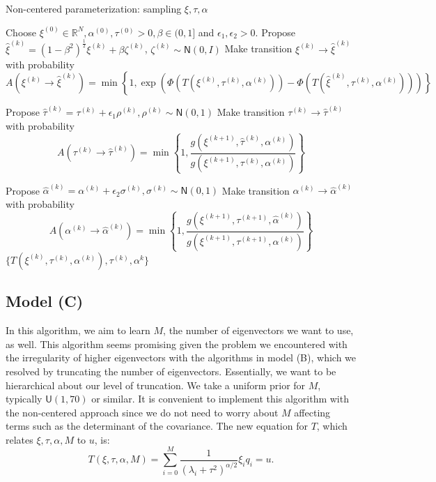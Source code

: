 \documentclass{siamart1116}
\begin{document}
        \begin{algorithm}
        \caption{Non-centered parameterization: sampling $\xi, \tau, \alpha$}
        \label{alg:xi_tau_alpha}
        \begin{algorithmic}
        \State Choose $\xi^{(0)} \in \mathbb{R}^N, \alpha^{(0)}, \tau^{(0)} > 0, \beta \in (0, 1]$ and $\epsilon_1, \epsilon_2 > 0$.
        \State Propose $\hat\xi^{(k)} = (1-\beta^2)^{\frac{1}{2}}\xi^{(k)} + \beta \zeta^{(k)}$, $\zeta^{(k)} \sim \mathsf{N}(0, I)$
        \State Make transition $\xi^{(k)} \to \hat\xi^{(k)}$ with probability
        \[ A(\xi^{(k)} \to \hat\xi^{(k)}) = \min\left\{1, \exp\left(\Phi(T(\xi^{(k)},\tau^{(k)},\alpha^{(k)})) - \Phi(T(\hat\xi^{(k)},\tau^{(k)},\alpha^{(k)}))\right) \right\}\] 

        \State Propose $\hat\tau^{(k)} = \tau^{(k)} + \epsilon_1 \rho^{(k)}, \rho^{(k)} \sim \mathsf{N}(0,1)$
        \State Make transition $\tau^{(k)} \to \hat\tau^{(k)}$ with probability
        \[ A(\tau^{(k)} \to \hat\tau^{(k)}) = \min\left\{1, \frac{g(\xi^{(k+1)},\hat\tau^{(k)},\alpha^{(k)})}{g(\xi^{(k+1)},\tau^{(k)},\alpha^{(k)})} \right\}\] 

        \State Propose $\hat\alpha^{(k)} = \alpha^{(k)} + \epsilon_2 \sigma^{(k)}, \sigma^{(k)} \sim \mathsf{N}(0,1)$
        \State Make transition $\alpha^{(k)} \to \hat\alpha^{(k)}$ with probability
        \[ A(\alpha^{(k)} \to \hat\alpha^{(k)}) = \min\left\{1, \frac{g(\xi^{(k+1)},\tau^{(k+1)},\hat \alpha^{(k)})}{g(\xi^{(k+1)},\tau^{(k+1)},\alpha^{(k)})} \right\}\]
        \EndFor
        \State \Return $\{ T(\xi^{(k)},\tau^{(k)},\alpha^{(k)}), \tau^{(k)}, \alpha^{k} \}$
        \end{algorithmic}
        \end{algorithm}

    \subsection{Model (C)}
        In this algorithm, we aim to learn $M$, the number of eigenvectors we want to use, as well. This algorithm seems promising given the problem we encountered with the irregularity of higher eigenvectors with the algorithms in model (B), which we resolved by truncating the number of eigenvectors. Essentially, we want to be hierarchical about our level of truncation. We take a uniform prior for $M$, typically $\mathsf{U}(1,70)$ or similar. It is convenient to implement this algorithm with the non-centered approach since we do not need to worry about $M$ affecting terms such as the determinant of the covariance. The new equation for $T$, which relates $\xi, \tau, \alpha, M$ to $u$, is:
        \begin{equation}
        \label{eqn:noncentered_T_M}
        T(\xi,\tau,\alpha, M) = \sum_{i=0}^M \frac{1}{(\lambda_i+\tau^2)^{\alpha/2}}\xi_iq_i = u.
        \end{equation}
\end{document}
